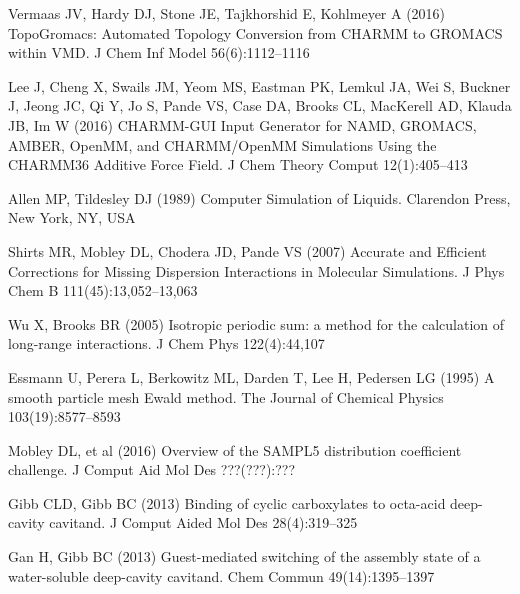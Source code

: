 \begin{thebibliography}{25}
Vermaas JV, Hardy DJ, Stone JE, Tajkhorshid E, Kohlmeyer A (2016)
  {TopoGromacs}: {Automated} {Topology} {Conversion} from {CHARMM} to {GROMACS}
  within {VMD}. J Chem Inf Model 56(6):1112--1116

Lee J, Cheng X, Swails JM, Yeom MS, Eastman PK, Lemkul JA, Wei S, Buckner J,
  Jeong JC, Qi Y, Jo S, Pande VS, Case DA, Brooks CL, MacKerell AD, Klauda JB,
  Im W (2016) {CHARMM}-{GUI} {Input} {Generator} for {NAMD}, {GROMACS},
  {AMBER}, {OpenMM}, and {CHARMM}/{OpenMM} {Simulations} {Using} the {CHARMM}36
  {Additive} {Force} {Field}. J Chem Theory Comput 12(1):405--413

Allen MP, Tildesley DJ (1989) Computer Simulation of Liquids. Clarendon Press,
  New York, NY, USA

Shirts MR, Mobley DL, Chodera JD, Pande VS (2007) Accurate and {Efficient}
  {Corrections} for {Missing} {Dispersion} {Interactions} in {Molecular}
  {Simulations}. J Phys Chem B 111(45):13,052--13,063

Wu X, Brooks BR (2005) Isotropic periodic sum: a method for the calculation of
  long-range interactions. J Chem Phys 122(4):44,107

Essmann U, Perera L, Berkowitz ML, Darden T, Lee H, Pedersen LG (1995) A smooth
  particle mesh {Ewald} method. The Journal of Chemical Physics
  103(19):8577--8593

Mobley DL, {et al} (2016) Overview of the SAMPL5 distribution coefficient
  challenge. J Comput Aid Mol Des ???(???):???

Gibb CLD, Gibb BC (2013) Binding of cyclic carboxylates to octa-acid
  deep-cavity cavitand. J Comput Aided Mol Des 28(4):319--325

Gan H, Gibb BC (2013) Guest-mediated switching of the assembly state of a
  water-soluble deep-cavity cavitand. Chem Commun 49(14):1395--1397


\end{thebibliography}
